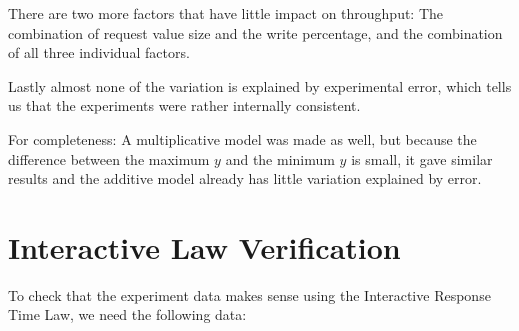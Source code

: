 \documentclass[11pt]{article}
\begin{document}
There are two more factors that have little impact on throughput: The combination of request value size and the write percentage, and the combination of all three individual factors.

Lastly almost none of the variation is explained by experimental error, which tells us that the experiments were rather internally consistent.

For completeness: A multiplicative model was made as well, but because the difference between the maximum $y$ and the minimum $y$ is small, it gave similar results and the additive model already has little variation explained by error.

% 
% 
% 

\section{Interactive Law Verification}\label{sec:interactive-law}



To check that the experiment data makes sense using the Interactive Response Time Law, we need the following data:
\end{document}
